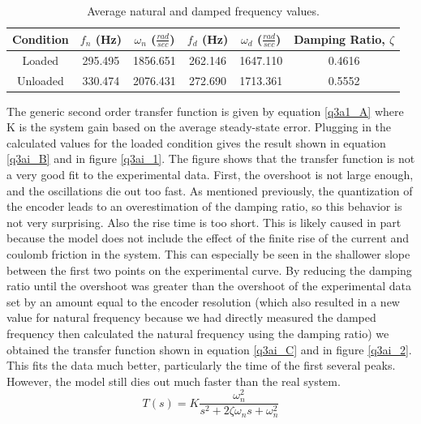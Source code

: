 \documentclass{article}
\theoremstyle{plain}
\theoremstyle{definition}
\theoremstyle{remark}
\begin{document}
\begin{table}[htb]
\begin{center}
    \begin{tabular}{|c|c|c|c|c|c|}
        \hline
        Condition & $f _n$ (Hz)  & $\omega _n$ ($\frac{rad}{sec}$) & $f _d$ (Hz) &  $\omega _d$ ($\frac{rad}{sec}$) & Damping Ratio, $\zeta$   \\ \hline
        Loaded   & 295.495   & 1856.651 & 262.146 &  1647.110 & 0.4616\\ 
        Unloaded   & 330.474   & 2076.431 & 272.690 & 1713.361 & 0.5552         \\         
        \hline
    \end{tabular}
\caption{Average natural and damped frequency values.}
\label{q3ai_@}
\end{center}
\end{table}

The generic second order transfer function is given by equation \ref{q3a1_A} where K is the system gain based on the average steady-state error. Plugging in the calculated values for the loaded condition gives the result shown in equation \ref{q3ai_B} and in figure \ref{q3ai_1}. The figure shows that the transfer function is not a very good fit to the experimental data. First, the overshoot is not large enough, and the oscillations die out too fast. As mentioned previously, the quantization of the encoder leads to an overestimation of the damping ratio, so this behavior is not very surprising. Also the rise time is too short. This is likely caused in part because the model does not include the effect of the finite rise of the current and coulomb friction in the system. This can especially be seen in the shallower slope between the first two points on the experimental curve. By reducing the damping ratio until the overshoot was greater than the overshoot of the experimental data set by an amount equal to the encoder resolution (which also resulted in a new value for natural frequency because we had directly measured the damped frequency then calculated the natural frequency using the damping ratio) we obtained the transfer function shown in equation \ref{q3ai_C} and in figure \ref{q3ai_2}. This fits the data much better, particularly the time of the first several peaks. However, the model still dies out much faster than the real system.\\

\begin{equation}
\label{q3ai_A}
T(s) = K \frac{\omega _n^2}{s^2 + 2\zeta \omega _n s + \omega _n^2}
\end{equation}
\end{document}

